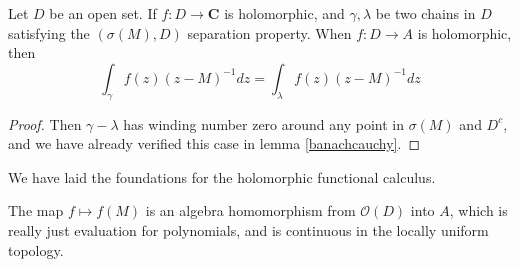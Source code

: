 \begin{lemma}
    Let $D$ be an open set. If $f: D \to \mathbf{C}$ is holomorphic, and $\gamma, \lambda$ be two chains in $D$ satisfying the $(\sigma(M), D)$ separation property. When $f: D \to A$ is holomorphic, then
    \[ \int_\gamma f(z) (z - M)^{-1} dz = \int_\lambda f(z) (z - M)^{-1} dz \]
\end{lemma}
\begin{proof}
    Then $\gamma - \lambda$ has winding number zero around any point in $\sigma(M)$ and $D^c$, and we have already verified this case in lemma \ref{banachcauchy}.
\end{proof}

We have laid the foundations for the holomorphic functional calculus.

\begin{theorem}
    The map $f \mapsto f(M)$ is an algebra homomorphism from $\mathcal{O}(D)$ into $A$, which is really just evaluation for polynomials, and is continuous in the locally uniform topology.
\end{theorem}
